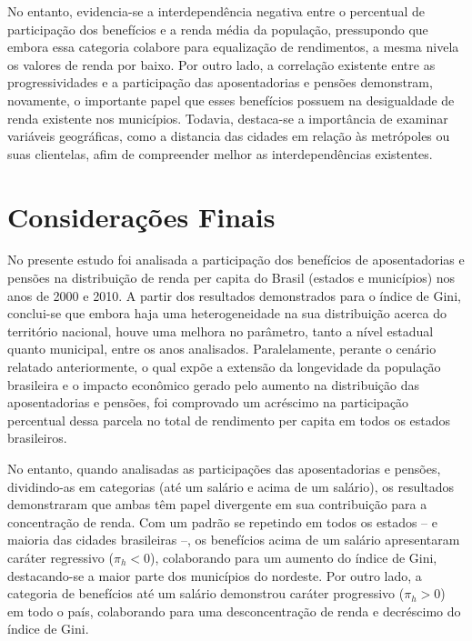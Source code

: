No entanto, evidencia-se a interdependência negativa entre o percentual de participação dos benefícios e a renda média da população, pressupondo que embora essa categoria colabore para equalização de rendimentos, a mesma nivela os valores de renda por baixo. Por outro lado, a correlação existente entre as progressividades e a participação das aposentadorias e pensões demonstram, novamente, o importante papel que esses benefícios possuem na desigualdade de renda existente nos municípios. Todavia, destaca-se a importância de examinar variáveis geográficas, como a distancia das cidades em relação às metrópoles ou suas clientelas, afim de compreender melhor as interdependências existentes.


\section{Considerações Finais}\label{cap04:conclusoes}

No presente estudo foi analisada a participação dos benefícios de aposentadorias e pensões na distribuição de renda per capita do Brasil (estados e municípios) nos anos de 2000 e 2010. A partir dos resultados demonstrados para o índice de Gini, conclui-se que embora haja uma heterogeneidade na sua distribuição acerca do território nacional, houve uma melhora no parâmetro, tanto a nível estadual quanto municipal, entre os anos analisados. Paralelamente, perante o cenário relatado anteriormente, o qual expõe a extensão da longevidade da população brasileira e o impacto econômico gerado pelo aumento na distribuição das aposentadorias e pensões, foi comprovado um acréscimo na participação percentual dessa parcela no total de rendimento per capita em todos os estados brasileiros.

No entanto, quando analisadas as participações das aposentadorias e pensões, dividindo-as em categorias (até um salário e acima de um salário), os resultados demonstraram que ambas têm papel divergente em sua contribuição para a concentração de renda. Com um padrão se repetindo em todos os estados – e maioria das cidades brasileiras –, os benefícios acima de um salário apresentaram caráter regressivo ($ \pi_h < 0$), colaborando para um aumento do índice de Gini, destacando-se a maior parte dos municípios do nordeste. Por outro lado, a categoria de benefícios até um salário demonstrou caráter progressivo ($\pi_h > 0$) em todo o país, colaborando para uma desconcentração de renda e decréscimo do índice de Gini.  

